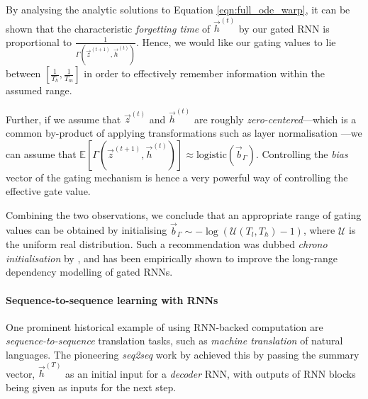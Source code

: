 By analysing the analytic solutions to Equation \ref{eqn:full_ode_warp}, it can be shown that the characteristic \emph{forgetting time} of $\vec{h}^{(t)}$ by our gated RNN is proportional to $\frac{1}{\Gamma(\vec{z}^{(t+1)}, \vec{h}^{(t)})}$. Hence, we would like our gating values to lie between $\left[\frac{1}{T_h}, \frac{1}{T_m}\right]$ in order to effectively remember information within the assumed range.

Further, if we assume that $\vec{z}^{(t)}$ and $\vec{h}^{(t)}$ are roughly \emph{zero-centered}---which is a common by-product of applying transformations such as layer normalisation \citep{ba2016layer}---we can assume that $\mathbb{E}[\Gamma(\vec{z}^{(t+1)}, \vec{h}^{(t)})] \approx \mathrm{logistic}(\vec{b}_\Gamma)$. Controlling the \emph{bias} vector of the gating mechanism is hence a very powerful way of controlling the effective gate value.

Combining the two observations, we conclude that an appropriate range of gating values can be obtained by initialising $\vec{b}_\Gamma\sim-\log(\mathcal{U}(T_l, T_h) - 1)$, where $\mathcal{U}$ is the uniform real distribution. Such a recommendation was dubbed \emph{chrono initialisation} by \citet{tallec2018can}, and has been empirically shown to improve the long-range dependency modelling of gated RNNs.

\paragraph{Sequence-to-sequence learning with RNNs}
One prominent historical example of using RNN-backed computation are \emph{sequence-to-sequence} translation tasks, such as {\em machine translation} of natural languages. The pioneering \emph{seq2seq} work by \citet{sutskever2014sequence} achieved this by passing the summary vector, $\vec{h}^{(T)}$ as an initial input for a \emph{decoder} RNN, with outputs of RNN blocks being given as inputs for the next step.

